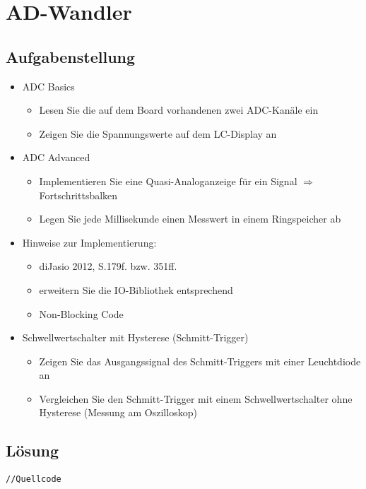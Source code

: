 \section{AD-Wandler}
\subsection{Aufgabenstellung}

\begin{itemize}%
		\item ADC Basics
		\begin{itemize}
			\item Lesen Sie die auf dem Board vorhandenen zwei ADC-Kanäle ein
			\item Zeigen Sie die Spannungswerte auf dem LC-Display an
		\end{itemize}
		\item ADC Advanced
		\begin{itemize}
			\item Implementieren Sie eine Quasi-Analoganzeige für ein Signal \newline
			 $\Rightarrow$ \grqq Fortschrittsbalken\grqq
			 \item Legen Sie jede Millisekunde einen Messwert in einem Ringspeicher ab
		\end{itemize}
		\item Hinweise zur Implementierung:
		\begin{itemize}
			\item diJasio 2012, S.179f. bzw. 351ff.
			\item erweitern Sie die IO-Bibliothek entsprechend
			\item Non-Blocking Code
		\end{itemize}
		\item Schwellwertschalter mit Hysterese (Schmitt-Trigger)
		\begin{itemize}
			\item Zeigen Sie das Ausgangssignal des Schmitt-Triggers mit einer Leuchtdiode an
			\item Vergleichen Sie den Schmitt-Trigger mit einem Schwellwertschalter ohne Hysterese (Messung am Oszilloskop)
		\end{itemize}
\end{itemize}

\subsection{Lösung}




\begin{lstlisting}[frame=htrbl, caption={Listening Bezeichnung}, label={lst:Referenzname}]
//Quellcode
\end{lstlisting}

